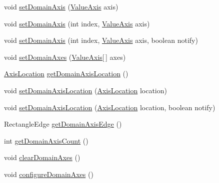 \begin{DoxyCompactItemize}
\item 
void \mbox{\hyperlink{classorg_1_1jfree_1_1chart_1_1plot_1_1_x_y_plot_a3107d21e7a027e58e84cd5e75293d4b5}{set\+Domain\+Axis}} (\mbox{\hyperlink{classorg_1_1jfree_1_1chart_1_1axis_1_1_value_axis}{Value\+Axis}} axis)
\item 
void \mbox{\hyperlink{classorg_1_1jfree_1_1chart_1_1plot_1_1_x_y_plot_a688e91cf072d5d4e54736212ccd81e1e}{set\+Domain\+Axis}} (int index, \mbox{\hyperlink{classorg_1_1jfree_1_1chart_1_1axis_1_1_value_axis}{Value\+Axis}} axis)
\item 
void \mbox{\hyperlink{classorg_1_1jfree_1_1chart_1_1plot_1_1_x_y_plot_ab3a0fa76fc235deac06f35896628cd72}{set\+Domain\+Axis}} (int index, \mbox{\hyperlink{classorg_1_1jfree_1_1chart_1_1axis_1_1_value_axis}{Value\+Axis}} axis, boolean notify)
\item 
void \mbox{\hyperlink{classorg_1_1jfree_1_1chart_1_1plot_1_1_x_y_plot_afdba09c2c39e5f02dad056aa4a09416a}{set\+Domain\+Axes}} (\mbox{\hyperlink{classorg_1_1jfree_1_1chart_1_1axis_1_1_value_axis}{Value\+Axis}}\mbox{[}$\,$\mbox{]} axes)
\item 
\mbox{\hyperlink{classorg_1_1jfree_1_1chart_1_1axis_1_1_axis_location}{Axis\+Location}} \mbox{\hyperlink{classorg_1_1jfree_1_1chart_1_1plot_1_1_x_y_plot_a10a59b35a61cf4cd839e23f498ab674e}{get\+Domain\+Axis\+Location}} ()
\item 
void \mbox{\hyperlink{classorg_1_1jfree_1_1chart_1_1plot_1_1_x_y_plot_a39ce84df63e84f33fd34526351b70060}{set\+Domain\+Axis\+Location}} (\mbox{\hyperlink{classorg_1_1jfree_1_1chart_1_1axis_1_1_axis_location}{Axis\+Location}} location)
\item 
void \mbox{\hyperlink{classorg_1_1jfree_1_1chart_1_1plot_1_1_x_y_plot_a3ea0feb425ed1e2261511a190d8b141d}{set\+Domain\+Axis\+Location}} (\mbox{\hyperlink{classorg_1_1jfree_1_1chart_1_1axis_1_1_axis_location}{Axis\+Location}} location, boolean notify)
\item 
Rectangle\+Edge \mbox{\hyperlink{classorg_1_1jfree_1_1chart_1_1plot_1_1_x_y_plot_a6d2e12b65dddef26cfade5a8322f1fcd}{get\+Domain\+Axis\+Edge}} ()
\item 
int \mbox{\hyperlink{classorg_1_1jfree_1_1chart_1_1plot_1_1_x_y_plot_a31f7f2673e1f39e5d1099252e2068076}{get\+Domain\+Axis\+Count}} ()
\item 
void \mbox{\hyperlink{classorg_1_1jfree_1_1chart_1_1plot_1_1_x_y_plot_a0c15e76e0e3466c41fe6537d2c356b15}{clear\+Domain\+Axes}} ()
\item 
void \mbox{\hyperlink{classorg_1_1jfree_1_1chart_1_1plot_1_1_x_y_plot_af126a8a9a86d19e7a8dbc802ba88b1df}{configure\+Domain\+Axes}} ()

\end{DoxyCompactItemize}
